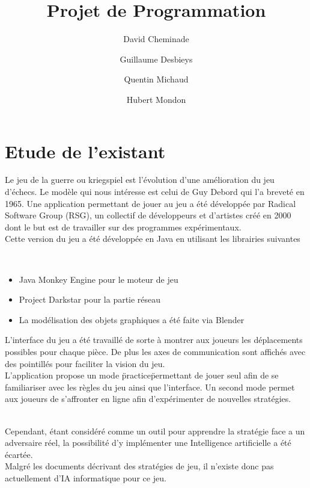 \documentclass[12pt]{article}
\begin{document}
	\title{Projet de Programmation}
	\author{David Cheminade\and Guillaume Desbieys\and Quentin Michaud\and Hubert Mondon}
	\date{}
	\maketitle

	\let\thefootnote\relax

	\section{Etude de l'existant}

		Le jeu de la guerre ou kriegspiel est l'évolution d'une amélioration du jeu d'échecs.
		Le modèle qui nous intéresse est celui de Guy Debord qui l'a breveté en 1965.
		Une application permettant de jouer au jeu a été développée par Radical Software Group (RSG), un collectif de développeurs et d'artistes créé en 2000 dont le but est de travailler sur des programmes expérimentaux.\\[1\baselineskip]
		Cette version du jeu a été développée en Java en utilisant les librairies suivantes

		~~\\

		\begin{itemize}
			\item Java Monkey Engine pour le moteur de jeu
			\item Project Darkstar pour la partie réseau
			\item La modélisation des objets graphiques a été faite via Blender
			~~\\
		\end{itemize}

		L'interface du jeu a été travaillé de sorte à montrer aux joueurs les déplacements possibles pour chaque pièce. De plus les axes de communication sont affichés avec des pointillés pour faciliter la vision du jeu.\\[1\baselineskip]
		L'application propose un mode \"practice\" permettant de jouer seul afin de se familiariser avec les règles du jeu ainsi que l'interface.
		Un second mode permet aux joueurs de s'affronter en ligne afin d'expérimenter de nouvelles stratégies.

		~~\\

		Cependant, étant considéré comme un outil pour apprendre la stratégie face a un adversaire réel, la possibilité d'y implémenter une Intelligence artificielle a été écartée.\\[1\baselineskip]
		Malgré les documents décrivant des stratégies de jeu, il n'existe donc pas actuellement d'IA informatique pour ce jeu.
\end{document}
